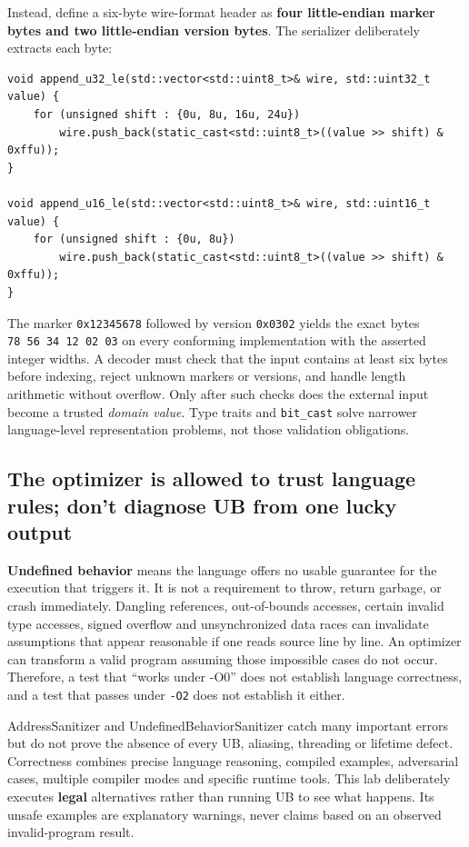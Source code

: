Instead, define a six-byte wire-format header as \textbf{four little-endian marker bytes and two little-endian version bytes}. The serializer deliberately extracts each byte:

\begin{verbatim}
void append_u32_le(std::vector<std::uint8_t>& wire, std::uint32_t value) {
    for (unsigned shift : {0u, 8u, 16u, 24u})
        wire.push_back(static_cast<std::uint8_t>((value >> shift) & 0xffu));
}

void append_u16_le(std::vector<std::uint8_t>& wire, std::uint16_t value) {
    for (unsigned shift : {0u, 8u})
        wire.push_back(static_cast<std::uint8_t>((value >> shift) & 0xffu));
}
\end{verbatim}

The marker \texttt{0x12345678} followed by version \texttt{0x0302} yields the exact bytes \texttt{78\ 56\ 34\ 12\ 02\ 03} on every conforming implementation with the asserted integer widths. A decoder must check that the input contains at least six bytes before indexing, reject unknown markers or versions, and handle length arithmetic without overflow. Only after such checks does the external input become a trusted \emph{domain value}. Type traits and \texttt{bit\_cast} solve narrower language-level representation problems, not those validation obligations.

\subsection{The optimizer is allowed to trust language rules; don't diagnose UB from one lucky output}\label{05-engine-i-ch004-the-optimizer-is-allowed-to-trust-language-rules-dont-diagnose-ub-from-one-lucky-output}

\textbf{Undefined behavior} means the language offers no usable guarantee for the execution that triggers it. It is not a requirement to throw, return garbage, or crash immediately. Dangling references, out-of-bounds accesses, certain invalid type accesses, signed overflow and unsynchronized data races can invalidate assumptions that appear reasonable if one reads source line by line. An optimizer can transform a valid program assuming those impossible cases do not occur. Therefore, a test that ``works under -O0'' does not establish language correctness, and a test that passes under \texttt{-O2} does not establish it either.

AddressSanitizer and UndefinedBehaviorSanitizer catch many important errors but do not prove the absence of every UB, aliasing, threading or lifetime defect. Correctness combines precise language reasoning, compiled examples, adversarial cases, multiple compiler modes and specific runtime tools. This lab deliberately executes \textbf{legal} alternatives rather than running UB to see what happens. Its unsafe examples are explanatory warnings, never claims based on an observed invalid-program result.

